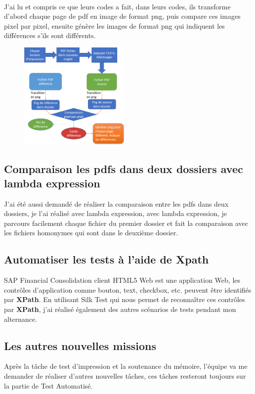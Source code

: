 \documentclass[french]{article}
\begin{document}
	\paragraph*{}
	J'ai lu et compris ce que leurs codes a fait, dans leurs codes, ils transforme d'abord chaque page de pdf en image de format png, puis compare ces images pixel par pixel, ensuite génère les images de format png qui indiquent les différences s'ils sont différents.
	\begin{figure}[H]
		\centering
		\includegraphics[width=0.48\textwidth]{process_compar_pdf.png}
	\end{figure}
	\subsection{Comparaison les pdfs dans deux dossiers avec lambda expression}
	J'ai été aussi demandé de réaliser la comparaison entre les pdfs dans deux dossiers, je l'ai réalisé avec lambda expression, avec lambda expression, je parcours facilement chaque fichier du premier dossier et fait la comparaison avec les fichiers homonymes qui sont dans le deuxième dossier.
	
	\subsection{Automatiser les tests à l'aide de Xpath}
	SAP Financial Consolidation client HTML5 Web est une application Web, les contrôles d'application  comme bouton, text, checkbox, etc. peuvent être identifiés par \textbf{XPath}. En utilisant Silk Test qui nous permet de reconnaître ces contrôles par \textbf{XPath}, j'ai réalisé également des autres scénarios de tests pendant mon alternance.
	
	\subsection{Les autres nouvelles missions}
	Après la tâche de test d'impression et la soutenance du mémoire, l'équipe va me demander de réaliser d'autres nouvelles tâches, ces tâches resteront toujours sur la partie de Test Automatisé. 
	
\end{document}

